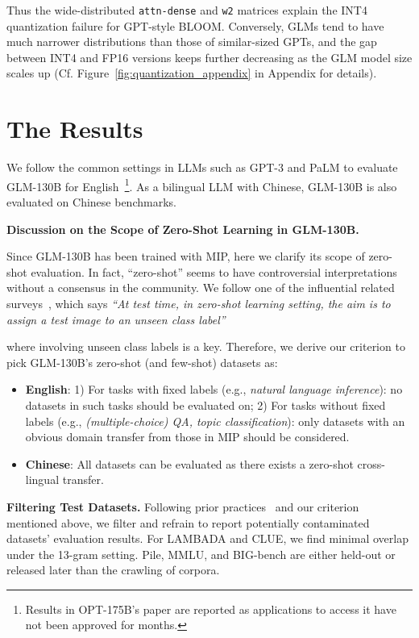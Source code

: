 Thus the wide-distributed \texttt{attn-dense} and \texttt{w2} matrices explain the INT4 quantization failure for GPT-style BLOOM. Conversely, GLMs tend to have much narrower distributions than those of similar-sized GPTs, and the gap between INT4 and FP16 versions keeps further decreasing as the GLM model size scales up (Cf.  Figure~\ref{fig:quantization_appendix} in Appendix for details).

\section{The Results}
\label{sec:results}

We follow the common settings in LLMs such as GPT-3 and PaLM to evaluate GLM-130B for English~\footnote{\small Results in OPT-175B's paper are reported as applications to access it have not been approved for months.}. As a bilingual LLM with Chinese, GLM-130B is also evaluated on Chinese benchmarks. 

\textbf{Discussion on the Scope of Zero-Shot Learning in GLM-130B.} 

Since GLM-130B has been trained with MIP, here we clarify its scope of zero-shot evaluation. In fact, ``zero-shot'' seems to have controversial interpretations without a consensus in the community. We follow one of the influential related surveys~\citep{xian2018zero}, which says 
\textit{``At test time, in zero-shot learning setting, the aim is to assign a test image to an unseen class label''}

where involving unseen class labels is a key. Therefore, we derive our criterion to pick GLM-130B's zero-shot (and few-shot) datasets as:

\begin{itemize}[leftmargin=*,itemsep=0pt,parsep=0.2em,topsep=0.0em,partopsep=0.0em]
    \item \textbf{English}: 1) For tasks with fixed labels (e.g., \textit{natural language inference}): no datasets in such tasks should be evaluated on; 2) For tasks without fixed labels (e.g., \textit{(multiple-choice) QA, topic classification}): only datasets with an obvious domain transfer from those in MIP should be considered. 
    \item \textbf{Chinese}: All datasets can be evaluated as there exists a zero-shot cross-lingual transfer.
\end{itemize}

\textbf{Filtering Test Datasets.} Following prior practices~\citep{brown2020language,rae2021scaling} and our criterion mentioned above, we filter and refrain to report potentially contaminated datasets' evaluation results. For LAMBADA and CLUE, we find minimal overlap under the 13-gram setting. Pile, MMLU, and BIG-bench are either held-out or released later than the crawling of corpora.

